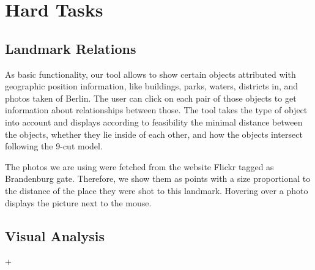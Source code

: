 \section*{Hard Tasks}

\subsection*{Landmark Relations}

As basic functionality, our tool allows to show certain objects attributed with
geographic position information, like buildings, parks, waters, districts in, and
photos taken of Berlin.
The user can click on each pair of those objects to get information about
relationships between those.
The tool takes the type of object into account and displays according
to feasibility the minimal distance between the objects, whether they lie
inside of each other, and how the objects intersect following the 9-cut model.

The photos we are using were fetched from the website Flickr tagged
as Brandenburg gate.
Therefore, we show them as points with a size proportional to
the distance of the place they were shot to this landmark.
Hovering over a photo displays the picture next to the mouse.

\subsection*{Visual Analysis}

\todo{}

+


